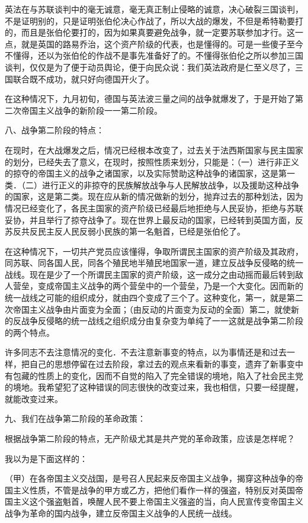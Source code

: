 英法在与苏联谈判中的毫无诚意，毫无真正制止侵略的诚意，决心破裂三国谈判，不是证明别的，只是证明张伯伦决心作战了，所以大战的爆发，不但是希特勒要打的，而且是张伯伦要打的，因为如果真要避免战争，就一定要苏联参加才行。这一点，就是英国的路易乔治，这个资产阶级的代表，也是懂得的。可是一些傻子至今不懂得，还以为张伯伦的作战不是事先准备好了的。不懂得张伯伦之所以参加三国谈判，仅仅是为了便于动员舆论，便于向民众说：我们英法政府是仁至义尽了，三国联合既不成功，就只好向德国开火了。

在这种情况下，九月初旬，德国与英法波三量之间的战争就爆发了，于是开始了第二次帝国主义战争的新阶段一一第二阶段。

八、战争第二阶段的特点：

在现时，在大战爆发之后，情况已经根本改变了，过去关于法西斯国家与民主国家的划分，已经失去了意义，在现时，按照性质来划分，只能是：（一）进行非正义的掠夺的帝国主义的战争之诸国家，以及实际赞助这种战争的诸国家，这是第一类．（二）进行正义的非掠夺的民族解放战争与人民解放战争，以及援助这种战争的国家，这是第二类。现在应从新的情况做新的划分，抛弃过去的那种划法，因为情况已经变化了，各民主国家的资产阶级已经最后地拒绝与人民妥协，拒绝与苏联妥协，并且举行了掠夺战争了。现在世界上最反动的国家，已经转到英国方面，反苏反共反民主反人民反弱小民族的第一名魁首，已经是张伯伦了。

在这种情况下，一切共产党员应该懂得，争取所谓民主国家的资产阶级及其政府，同苏联、同各国人民，同各个殖民地半殖民地国家一道，建立反战争反侵略的统一战线。现在是少了一个所谓民主国家的资产阶级，这一成分之由动摇而最后转到敌人营垒，变成帝国主义战争的两个营垒中的一个营垒，乃是一个大变化。因而新的统一战线之可能的组织成分，就由四个变成了三个了。这种变化，第一，就是第二次帝国主义战争由片面变为全面；（由反动的片面变为反动的全面）第二，就使新的反战争反侵略的统一战线之组织成分由复杂变为单纯了一一这就是战争第二阶段的两个特点。

许多同志不去注意情况的变化．不去注意新事变的特点，以为事情还是和过去一样，把自己的思想停留在过去阶段，拿过去的观点来看新的事变，遗弃了新事变中有包藏的性质上的变化，因而不自觉的陷入了完全错误的境地，陷入了社会民主党的境地。我希望犯了这种错误的同志很快的改变过来，我也相信，只要一经提醒，就能改变过来。

九、我们在战争第二阶段的革命政策：

根据战争第二阶段的特点，无产阶级尤其是共产党的革命政策，应该是怎样呢？

我以为是下面这样的：

（甲）在各帝国主义交战国，是号召人民起来反帝国主义战争，揭穿这种战争的帝国主义性质，不管是战争的甲方或乙方，把他们看作一样的强盗，特别反对英国帝国主义这个强盗魁首，唤醒人民不要上帝国主义强盗的当，向人民宣传变帝国主义战争为革命的国内战争，建立反帝国主义战争的人民统一战线。


